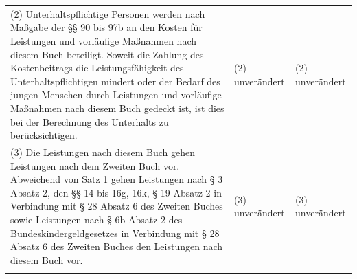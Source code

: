 \documentclass[10pt,a4paper,landscape]{article}
\begin{document}
\begin{longtable}{|L{8.2cm}|L{8.2cm}|L{8.2cm}|}
\hhline{|---|}
(2) Unterhaltspflichtige Personen werden  \newline nach Maßgabe der \S{}\S{} 90 bis 97b an den  \newline Kosten für Leistungen und vorläufige  \newline Maßnahmen nach diesem Buch beteiligt.  \newline Soweit die Zahlung des Kostenbeitrags die  \newline Leistungsfähigkeit des Unterhaltspflichtigen  \newline mindert oder der Bedarf des jungen  \newline Menschen durch Leistungen und vorläufige  \newline Maßnahmen nach diesem Buch gedeckt  \newline ist, ist dies bei der Berechnung des  \newline Unterhalts zu berücksichtigen. & (2) unverändert & (2) unverändert \\
\hhline{|---|}
(3) Die Leistungen nach diesem Buch  \newline gehen Leistungen nach dem Zweiten Buch  \newline vor. Abweichend von Satz 1 gehen  \newline Leistungen nach \S{} 3 Absatz 2, den \S{}\S{} 14  \newline bis 16g, 16k, \S{} 19 Absatz 2 in Verbindung  \newline mit \S{} 28 Absatz 6 des Zweiten Buches  \newline sowie Leistungen nach \S{} 6b Absatz 2 des  \newline Bundeskindergeldgesetzes in Verbindung  \newline mit \S{} 28 Absatz 6 des Zweiten Buches den  \newline Leistungen nach diesem Buch vor. & (3) unverändert & (3) unverändert \\
\hhline{|---|}

\end{longtable}
\end{document}
